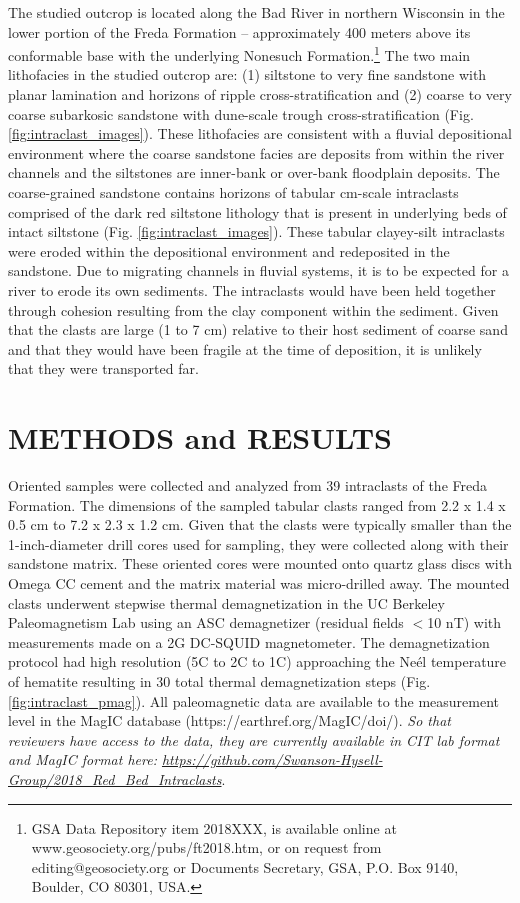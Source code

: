 \documentclass[11pt,letterpaper]{article}
\begin{document}
The studied outcrop is located along the Bad River in northern Wisconsin in the lower portion of the Freda Formation -- approximately 400 meters above its conformable base with the underlying Nonesuch Formation.\footnote{GSA Data Repository item 2018XXX, is available online at www.geosociety.org/pubs/ft2018.htm, or on request from editing@geosociety.org or Documents Secretary, GSA, P.O. Box 9140, Boulder, CO 80301, USA.} The two main lithofacies in the studied outcrop are: (1) siltstone to very fine sandstone with planar lamination and horizons of ripple cross-stratification and (2) coarse to very coarse subarkosic sandstone with dune-scale trough cross-stratification (Fig. \ref{fig:intraclast_images}).  These lithofacies are consistent with a fluvial depositional environment where the coarse sandstone facies are deposits from within the river channels and the siltstones are inner-bank or over-bank floodplain deposits. The coarse-grained sandstone contains horizons of tabular cm-scale intraclasts comprised of the dark red siltstone lithology that is present in underlying beds of intact siltstone (Fig. \ref{fig:intraclast_images}). These tabular clayey-silt intraclasts were eroded within the depositional environment and redeposited in the sandstone. Due to migrating channels in fluvial systems, it is to be expected for a river to erode its own sediments. The intraclasts would have been held together through cohesion resulting from the clay component within the sediment. Given that the clasts are large (1 to 7 cm) relative to their host sediment of coarse sand and that they would have been fragile at the time of deposition, it is unlikely that they were transported far.

\section*{METHODS and RESULTS}

Oriented samples were collected and analyzed from 39 intraclasts of the Freda Formation. The dimensions of the sampled tabular clasts ranged from 2.2 x 1.4 x 0.5 cm to 7.2 x 2.3 x 1.2 cm. Given that the clasts were typically smaller than the 1-inch-diameter drill cores used for sampling, they were collected along with their sandstone matrix. These oriented cores were mounted onto quartz glass discs with Omega CC cement and the matrix material was micro-drilled away. The mounted clasts underwent stepwise thermal demagnetization in the UC Berkeley Paleomagnetism Lab using an ASC demagnetizer (residual fields $<$10 nT) with measurements made on a 2G DC-SQUID magnetometer. The demagnetization protocol had high resolution (5\textdegree C to 2\textdegree C to 1\textdegree C) approaching the Ne\'el temperature of hematite resulting in 30 total thermal demagnetization steps (Fig. \ref{fig:intraclast_pmag}). All paleomagnetic data are available to the measurement level in the MagIC database (https://earthref.org/MagIC/doi/). \textit{So that reviewers have access to the data, they are currently available in CIT lab format and MagIC format here: \url{https://github.com/Swanson-Hysell-Group/2018_Red_Bed_Intraclasts}}.
\end{document}
